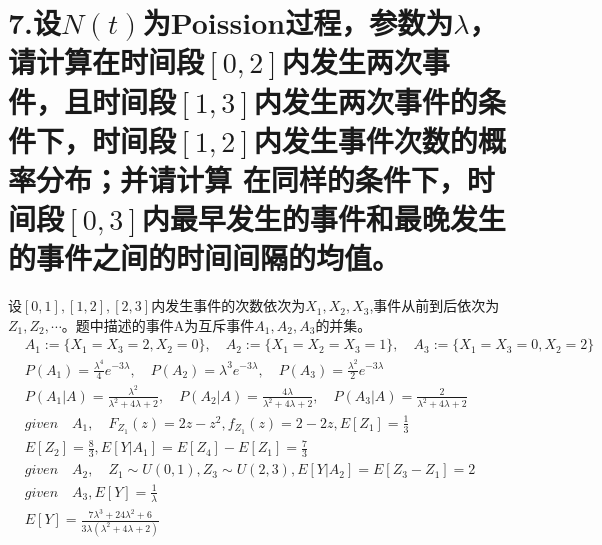 \documentclass[UTF8]{ctexart}
\begin{document}
\section*{7.设$N(t)$为Poission过程，参数为$\lambda$，请计算在时间段$[0,2]$内发生两次事
  件，且时间段$[1,3]$内发生两次事件的条件下，时间段$[1,2]$内发生事件次数的概率分布；并请计算
  在同样的条件下，时间段$[0,3]$内最早发生的事件和最晚发生的事件之间的时间间隔的均值。}
设$[0,1],[1,2],[2,3]$内发生事件的次数依次为$X_1,X_2,X_3$,事件从前到后依次为$Z_1,Z_2,
  \cdots$。题中描述的事件A为互斥事件$A_1,A_2,A_3$的并集。
\begin{equation*}
  \begin{aligned}
     & A_1:=\{X_1=X_3=2,X_2=0\},\quad A_2:=\{X_1=X_2=X_3=1\},\quad A_3:=\{X_1=
    X_3=0,X_2=2\}                                                                     \\
     & P(A_1)=\frac{\lambda^4}{4}e^{-3\lambda},\quad P(A_2)=\lambda^3e^{-3\lambda},
    \quad P(A_3)=\frac{\lambda^2}{2}e^{-3\lambda}                                     \\
     & P(A_1\lvert A)=\frac{\lambda^2}{\lambda^2+4\lambda+2},\quad
    P(A_2\lvert A)=\frac{4\lambda}{\lambda^2+4\lambda+2},\quad
    P(A_3\lvert A)=\frac{2}{\lambda^2+4\lambda+2}                                     \\
     & given\quad A_1,\quad F_{Z_1}(z)=2z-z^2,f_{Z_1}(z)=2-2z,E[Z_1]=\frac{1}{3}      \\
     & E[Z_2]=\frac{8}{3},E[Y\lvert A_1]=E[Z_4]-E[Z_1]=\frac{7}{3}                    \\
     & given\quad A_2,\quad Z_1\sim U(0,1),Z_3\sim U(2,3),E[Y\lvert A_2]=E[Z_3-Z_1]=2 \\
     & given\quad A_3, E[Y]=\frac{1}{\lambda}                                         \\
     & E[Y]=\frac{7\lambda^3+24\lambda^2+6}{3\lambda(\lambda^2+4\lambda+2)}
  \end{aligned}
\end{equation*}
\end{document}
